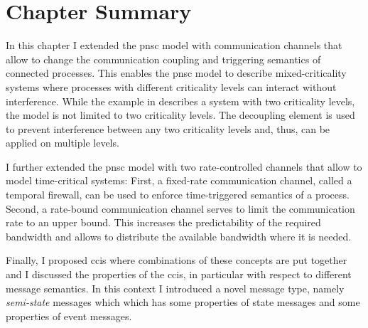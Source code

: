 \section{Chapter Summary}
\label{sect_tcm_summary}
In this chapter I extended the \gls{pnsc} model with communication channels that allow to change the communication coupling and triggering semantics of connected processes.
This enables the \gls{pnsc} model to describe mixed-criticality systems where processes with different criticality levels can interact without interference.
While the example in \Fig{\ref{fig_mc_pnsc_ex}} describes a system with two criticality levels, the model is not limited to two criticality levels.
The decoupling element is used to prevent interference between any two criticality levels and, thus, can be applied on multiple levels.

I further extended the \gls{pnsc} model with two rate-controlled channels that allow to model time-critical systems:
First, a fixed-rate communication channel, called a temporal firewall, can be used to enforce time-triggered semantics of a process.
Second, a rate-bound communication channel serves to limit the communication rate to an upper bound.
This increases the predictability of the required bandwidth and allows to distribute the available bandwidth where it is needed.

Finally, I proposed \glspl{cci} where combinations of these concepts are put together and I discussed the properties of the \glspl{cci}, in particular with respect to different message semantics.
In this context I introduced a novel message type, namely \emph{semi-state} messages which which has some properties of state messages and some properties of event messages.
